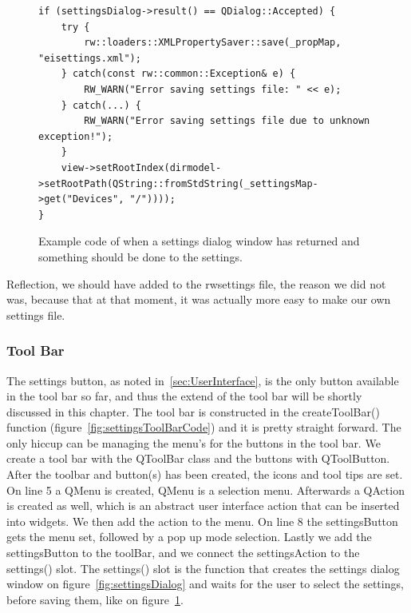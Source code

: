 \begin{figure}[h] %
\centering
\lstset{language=C++} 
\begin{lstlisting}[frame=single]  
if (settingsDialog->result() == QDialog::Accepted) {
	try {
		rw::loaders::XMLPropertySaver::save(_propMap, "eisettings.xml");
	} catch(const rw::common::Exception& e) {
		RW_WARN("Error saving settings file: " << e);
	} catch(...) {
		RW_WARN("Error saving settings file due to unknown exception!");
	}
	view->setRootIndex(dirmodel->setRootPath(QString::fromStdString(_settingsMap->get("Devices", "/")))); 
}
\end{lstlisting}
\caption{Example code of when a settings dialog window has returned and something should be done to the settings.}
\label{fig:settingsCodeReturnDialog} 	
\end{figure}

Reflection, we should have added to the rwsettings file, the reason we did not was, because that at that moment, it was actually more easy to make our own settings file.

\subsubsection{Tool Bar}
\label{sec:ToolBar}
The settings button, as noted in~\ref{sec:UserInterface}, is the only button available in the tool bar so far, and thus the extend of the tool bar will be shortly discussed in this chapter.
The tool bar is constructed in the createToolBar() function (figure~\ref{fig:settingsToolBarCode}) and it is pretty straight forward. The only hiccup can be managing the menu's for the buttons in the tool bar. We create a tool bar with the QToolBar class and the buttons with QToolButton. After the toolbar and button(s) has been created, the icons and tool tips are set. On line 5 a QMenu is created, QMenu is a selection menu. Afterwards a QAction is created as well, which is an abstract user interface action that can be inserted into widgets. We then add the action to the menu. On line 8 the settingsButton gets the menu set, followed by a pop up mode selection. Lastly we add the settingsButton to the toolBar, and we connect the settingsAction to the settings() slot. The settings() slot is the function that creates the settings dialog window on figure~\ref{fig:settingsDialog} and waits for the user to select the settings, before saving them, like on figure~\ref{fig:settingsCodeReturnDialog}.

